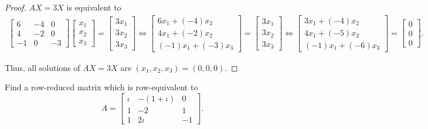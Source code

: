 \begin{proof}
    $AX = 3X$ is equivalent to
    \begin{align*}
        \begin{bmatrix}
            6  & -4 & 0  \\
            4  & -2 & 0  \\
            -1 & 0  & -3
        \end{bmatrix}
        \begin{bmatrix}
            x_{1} \\ x_{2} \\ x_{3}
        \end{bmatrix}
        =
        \begin{bmatrix}
            3x_{1} \\ 3x_{2} \\ 3x_{3}
        \end{bmatrix}
        \Longleftrightarrow
        \begin{bmatrix}
            6x_{1} + (-4)x_{2} \\ 4x_{1} + (-2)x_{2} \\ (-1)x_{1} + (-3)x_{3}
        \end{bmatrix}
        =
        \begin{bmatrix}
            3x_{1} \\ 3x_{2} \\ 3x_{3}
        \end{bmatrix}
        \Longleftrightarrow
        \begin{bmatrix}
            3x_{1} + (-4)x_{2} \\
            4x_{1} + (-5)x_{2} \\
            (-1)x_{1} + (-6)x_{3}
        \end{bmatrix}
        =
        \begin{bmatrix}
            0 \\ 0 \\ 0
        \end{bmatrix}.
    \end{align*}

    Thus, all solutions of $AX = 3X$ are $(x_{1}, x_{2}, x_{3}) = (0, 0, 0)$.
\end{proof}

\begin{exercise}
    Find a row-reduced matrix which is row-equivalent to
    \[
        A =
        \begin{bmatrix}
            \iota & -(1 + \iota) & 0  \\
            1     & -2           & 1  \\
            1     & 2\iota       & -1
        \end{bmatrix}.
    \]
\end{exercise}

